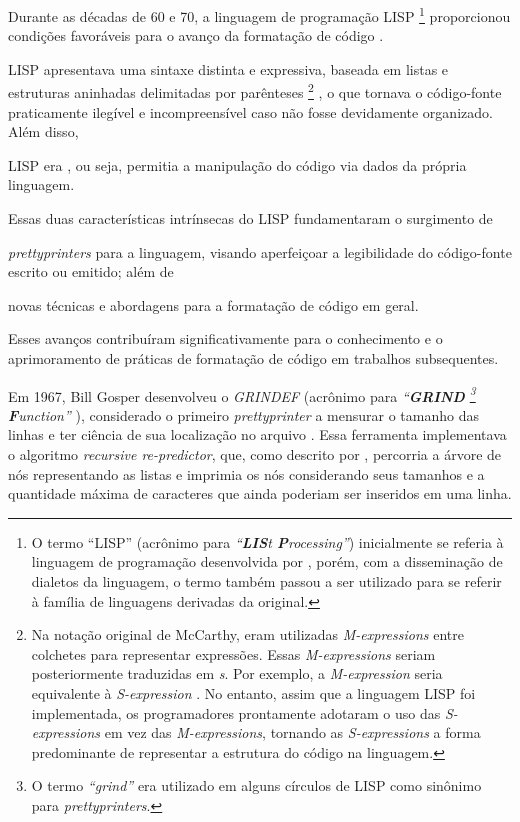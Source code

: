 \documentclass
 [11pt,a4paper,english,brazil,openright,sumario=tradicional,twoside]
 {abntex2}
\begin{document}
 Durante as décadas de 60 e 70, a linguagem de programação LISP%
 \footnote
  {O termo ``LISP'' (acrônimo para
   \textit{``\textbf{LIS}t \textbf{P}rocessing''})
   inicialmente se referia à linguagem de programação desenvolvida por
   \textcite{mccarthy-1960-recursive}, porém, com a disseminação de dialetos da
   linguagem, o termo também passou a ser utilizado para se referir à família
   de linguagens derivadas da original.}
 proporcionou condições favoráveis para o avanço da formatação de código
 \cite[2]{yelland-2015-new}.
 \begin{inparaenum}
  \item LISP apresentava uma sintaxe distinta e expressiva, baseada em listas e
        estruturas aninhadas delimitadas por parênteses%
        \footnote
         {Na notação original de McCarthy, eram utilizadas
          \textit{M-expressions} entre colchetes para representar expressões.
          Essas \textit{M-expressions} seriam posteriormente traduzidas em
          \textit{s}. Por exemplo, a \textit{M-expression}
           seria equivalente à
          \textit{S-expression} . No entanto,
          assim que a linguagem LISP foi implementada, os programadores
          prontamente adotaram o uso das \textit{S-expressions} em vez das
          \textit{M-expressions}, tornando as \textit{S-expressions} a forma
          predominante de representar a estrutura do código na linguagem.}%
        , o que tornava o código-fonte praticamente ilegível e incompreensível
        caso não fosse devidamente organizado. Além disso,
  \item LISP era , ou seja, permitia a manipulação do código
        via dados da própria linguagem.
 \end{inparaenum}
 Essas duas características intrínsecas do LISP fundamentaram o surgimento de
 \begin{inparaenum}
  \item \textit{prettyprinters} para a linguagem, visando aperfeiçoar a
        legibilidade do código-fonte escrito ou emitido; além de
  \item novas técnicas e abordagens para a formatação de código em geral.
 \end{inparaenum}
 Esses avanços contribuíram significativamente para o conhecimento e o
 aprimoramento de práticas de formatação de código em trabalhos subsequentes.

 Em 1967, Bill Gosper desenvolveu o \textit{GRINDEF} (acrônimo para
 \textit
  {``\textbf{GRIND}%
     \footnote
      {O termo \textit{``grind''} era utilizado em alguns círculos de LISP
       como sinônimo para \textit{prettyprinters}.}
     \textbf{F}unction''}%
 ), considerado o primeiro \textit{prettyprinter} a mensurar o tamanho das
 linhas e ter ciência de sua localização no arquivo
 \cites{gosper-2023-twubblesome}{griesemer-2022-cultural}. Essa ferramenta
 implementava o algoritmo \textit{recursive re-predictor}, que, como descrito
 por \textcite{goldstein-1973-pretty}, percorria a árvore de nós representando
 as listas e imprimia os nós considerando seus tamanhos e a quantidade máxima
 de caracteres que ainda poderiam ser inseridos em uma linha.
\end{document}
